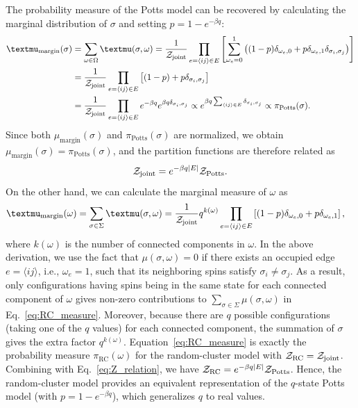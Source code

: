 The probability measure of the Potts model can be recovered by calculating the marginal distribution of $\sigma$ and setting $p = 1-e^{-\beta q}$:
\begin{equation}
	\begin{aligned}
	\mu_{\text{margin}}(\sigma) &= \sum_{\omega \in \Omega} \mu(\sigma, \omega) = \frac{1}{\scrZ_{\text{joint}}} \prod_{e=\langle ij \rangle \in E}\left[\sum_{\omega_e = 0}^1 \left((1-p)\delta_{\omega_e, 0} + p\delta_{\omega_e, 1}\delta_{\sigma_i, \sigma_j}\right)\right]\\
	&= \frac{1}{\scrZ_{\text{joint}}} \prod_{e=\langle ij \rangle \in E}\left[(1-p) + p\delta_{\sigma_i, \sigma_j}\right]\\
	&= \frac{1}{\scrZ_{\text{joint}}} \prod_{e=\langle ij \rangle \in E}e^{-\beta q} e^{\beta q\delta_{\sigma_i, \sigma_j}} 
	\propto e^{\beta q\sum_{\langle ij \rangle \in E}\delta_{\sigma_i, \sigma_j}} \propto \pi_{\text{Potts}}(\sigma).\\
	\end{aligned}
\end{equation}
Since both $\mu_{\text{margin}}(\sigma)$ and $\pi_{\text{Potts}}(\sigma)$ are normalized, we obtain $\mu_{\text{margin}}(\sigma) = \pi_{\text{Potts}}(\sigma)$,
and the partition functions are therefore related as
\begin{equation}\label{eq:Z_relation}
	{\mathcal Z}_{\text{joint}} = e^{-\beta q |E|} {\mathcal Z}_{\text{Potts}}.
\end{equation}
On the other hand, we can calculate the marginal measure of $\omega$ as
\begin{equation}\label{eq:RC_measure}
	\begin{aligned}
	\mu_{\text{margin}}(\omega) &= \sum_{\sigma \in \Sigma} \mu(\sigma, \omega)
	= \frac{1}{\scrZ_{\text{joint}}} q^{k(\omega)}\prod_{e=\langle ij \rangle \in E}\left[(1-p)\delta_{\omega_e, 0} + p\delta_{\omega_e, 1}\right],
	\end{aligned}
\end{equation}
where $k(\omega)$ is the number of connected components in $\omega$. In the above derivation, we use the fact that $\mu(\sigma, \omega) = 0$ if there exists an occupied edge $e = \langle ij \rangle$, i.e., $\omega_e = 1$,
such that its neighboring spins satisfy $\sigma_i \neq \sigma_j$. As a result, 
only configurations having spins being in the same state for each connected component of $\omega$ gives non-zero contributions to $\sum_{\sigma\in \Sigma} \mu(\sigma, \omega)$ in Eq.~\eqref{eq:RC_measure}.
Moreover, because there are $q$ possible configurations (taking one of the $q$ values) for each connected component, the summation of $\sigma$ gives the extra factor $q^{k(\omega)}$. 
Equation~\eqref{eq:RC_measure} is exactly the probability measure $\pi_{\text{RC}}(\omega)$ for the random-cluster model with ${\mathcal Z}_{\text{RC}} = {\mathcal Z}_{\text{joint}}$.
Combining with Eq.~\eqref{eq:Z_relation}, we have ${\mathcal Z}_{\text{RC}} = e^{-\beta q|E|} {\mathcal Z}_{\text{Potts}}$. Hence, the random-cluster model
provides an equivalent representation of the $q$-state Potts model (with $p = 1-e^{-\beta q}$), which generalizes $q$ to real values. 

